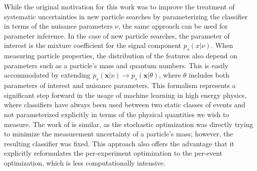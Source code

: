 \documentclass[12pt]{article}
\numberwithin{equation}{section}
\theoremstyle{plain}
\begin{document}
%
%

While the original motivation for this work was to improve the treatment of
systematic uncertainties in new particle searches by parameterizing the
classifier in terms of the nuisance parameters $\nu$, the same approach can be
used for parameter inference. In the case of new particle searches, the parameter
of interest is the mixture coefficient for the signal component $p_s(x|\nu)$.
When measuring particle properties, the distribution of the features also depend
on parameters such as a particle's mass and quantum numbers. This is easily
accommodated by extending $p_s(\mathbf{x}|\nu) \to p_s(\mathbf{x}|\theta)$, where $\theta$
includes both parameters of interest and nuisance parameters.
This formalism represents a significant step forward in the usage of machine
learning in high energy physics, where classifiers have always been used between two static
classes of events and not parameterized explicitly in terms of the physical
quantities we wish to measure.
The work of \cite{Whiteson:2006ws} is similar,
as the stochastic optimization was directly trying to minimize the measurement
uncertainty of a particle's mass; however, the resulting classifier was fixed.
This approach also offers the advantage that it explicitly reformulates the
per-experiment optimization to the per-event optimization, which is less
computationally intensive.
\end{document}
